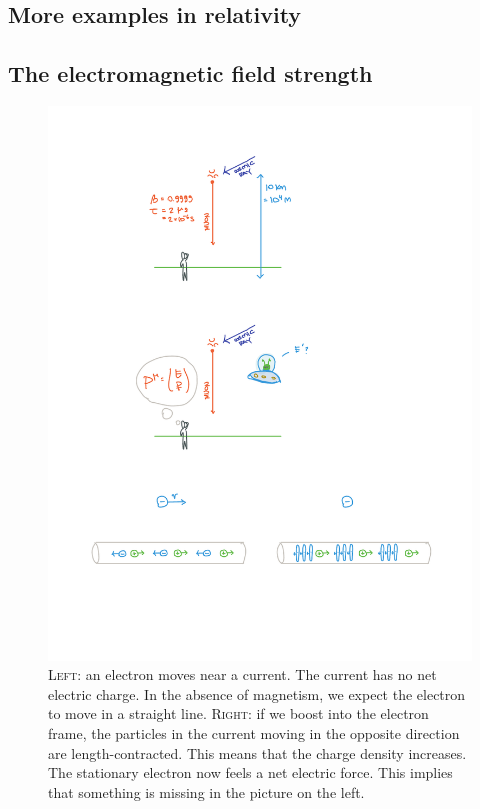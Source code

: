 \begin{subappendices}
\section{More examples in relativity}

\subsection{%
The electromagnetic field strength}

\begin{figure}[tb]
    \centering
    \includegraphics[width=\textwidth]{figures/EMcurrent.pdf}
    \caption{\textsc{Left}: an electron moves near a current. The current has no net electric charge. In the absence of magnetism, we expect the electron to move in a straight line. \textsc{Right}: if we boost into the electron frame, the particles in the current moving in the opposite direction are length-contracted. This means that the charge density increases. The stationary electron now feels a net electric force. This implies that something is missing in the picture on the left.}
    \label{fig:current}
\end{figure}


\end{subappendices}
